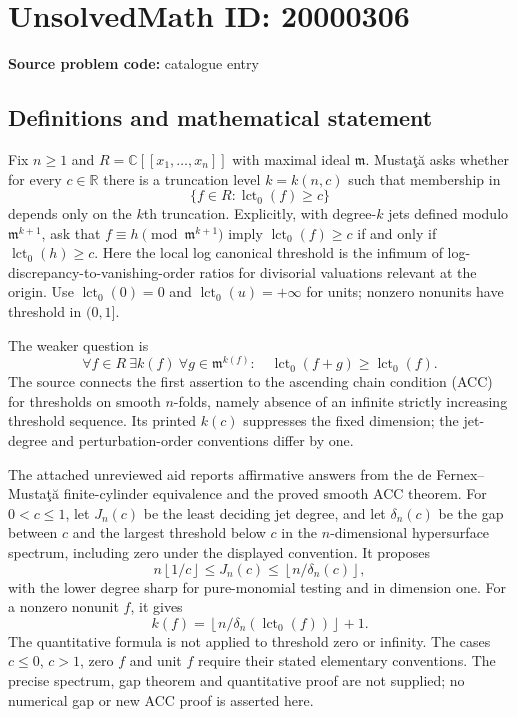 \documentclass[11pt]{article}
\newcommand{\R}{\mathbb{R}}
\newcommand{\C}{\mathbb{C}}
\begin{document}
\section*{UnsolvedMath ID: 20000306}
\textbf{Source problem code:} catalogue entry
\subsection{Definitions and mathematical statement}
Fix $n\ge1$ and $R=\C[[x_1,\ldots,x_n]]$ with maximal ideal $\mathfrak m$. Musta\c t\u a asks whether for every $c\in\R$ there is a truncation level $k=k(n,c)$ such that membership in
\[
\{f\in R:\operatorname{lct}_0(f)\ge c\}
\]
depends only on the $k$th truncation. Explicitly, with degree-$k$ jets defined modulo $\mathfrak m^{k+1}$, ask that $f\equiv h\pmod{\mathfrak m^{k+1}}$ imply $\operatorname{lct}_0(f)\ge c$ if and only if $\operatorname{lct}_0(h)\ge c$. Here the local log canonical threshold is the infimum of log-discrepancy-to-vanishing-order ratios for divisorial valuations relevant at the origin. Use $\operatorname{lct}_0(0)=0$ and $\operatorname{lct}_0(u)=+\infty$ for units; nonzero nonunits have threshold in $(0,1]$.

The weaker question is
\[
\forall f\in R\ \exists k(f)\ \forall g\in\mathfrak m^{k(f)}:\quad
\operatorname{lct}_0(f+g)\ge\operatorname{lct}_0(f).
\]
The source connects the first assertion to the ascending chain condition (ACC) for thresholds on smooth $n$-folds, namely absence of an infinite strictly increasing threshold sequence. Its printed $k(c)$ suppresses the fixed dimension; the jet-degree and perturbation-order conventions differ by one.

The attached unreviewed aid reports affirmative answers from the de Fernex--Musta\c t\u a finite-cylinder equivalence and the proved smooth ACC theorem. For $0<c\le1$, let $J_n(c)$ be the least deciding jet degree, and let $\delta_n(c)$ be the gap between $c$ and the largest threshold below $c$ in the $n$-dimensional hypersurface spectrum, including zero under the displayed convention. It proposes
\[
n\left\lfloor1/c\right\rfloor\le J_n(c)
\le\left\lfloor n/\delta_n(c)\right\rfloor,
\]
with the lower degree sharp for pure-monomial testing and in dimension one. For a nonzero nonunit $f$, it gives
\[
k(f)=\left\lfloor n/\delta_n(\operatorname{lct}_0(f))\right\rfloor+1.
\]
The quantitative formula is not applied to threshold zero or infinity. The cases $c\le0$, $c>1$, zero $f$ and unit $f$ require their stated elementary conventions. The precise spectrum, gap theorem and quantitative proof are not supplied; no numerical gap or new ACC proof is asserted here.
\end{document}
